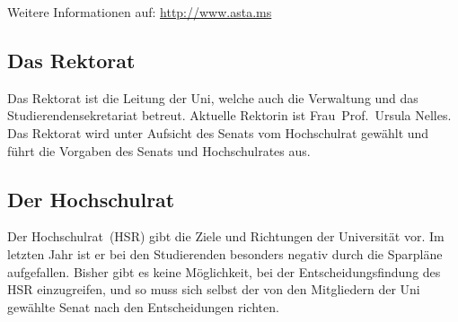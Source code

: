 \begin{multicols*}{2}
\begin{center}
{\begin{minipage}{0.95\columnwidth}
Weitere Informationen auf: \url{http://www.asta.ms}
\end{minipage}
}
\medskip
\end{center}

\subsection*{Das Rektorat}
Das Rektorat ist die Leitung der Uni, welche auch die Verwaltung und das Studierendensekretariat betreut. Aktuelle Rektorin ist Frau~Prof.~Ursula Nelles. Das Rektorat wird unter Aufsicht des Senats vom Hochschulrat gewählt und führt die Vorgaben des Senats und Hochschulrates aus.

\subsection*{Der Hochschulrat}
Der Hochschulrat~(HSR) gibt die Ziele und Richtungen der Universität vor. Im letzten Jahr ist er bei den Studierenden besonders negativ durch die Sparpläne aufgefallen. Bisher gibt es keine Möglichkeit, bei der Entscheidungsfindung des HSR einzugreifen, und so muss sich selbst der von den Mitgliedern der Uni gewählte Senat nach den Entscheidungen richten.

\end{multicols*}


